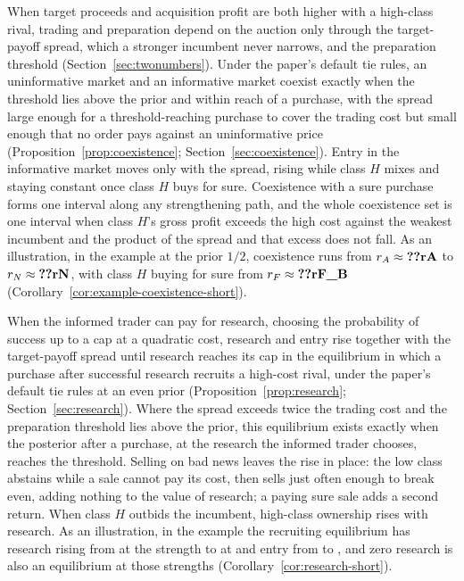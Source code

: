 When target proceeds and acquisition profit are both higher with a high-class rival, trading and preparation
depend on the auction only through the target-payoff spread, which a stronger incumbent never narrows, and the
preparation threshold (Section~\ref{sec:twonumbers}). Under the paper's default tie rules, an uninformative market and an
informative market coexist exactly when the threshold lies above the prior and within reach of a purchase, with the
spread large enough for a threshold-reaching purchase to cover the trading cost but small enough that no order pays
against an uninformative price (Proposition~\ref{prop:coexistence}; Section~\ref{sec:coexistence}). Entry in the
informative market moves only with the spread, rising while class \(H\) mixes and staying constant once class \(H\)
buys for sure. Coexistence with a sure purchase forms one interval along any strengthening path, and the whole
coexistence set is one interval when class \(H\)'s gross profit exceeds the high cost against the weakest incumbent
and the product of the spread and that excess does not fall. As an illustration, in the example at the prior
\(1/2\), coexistence runs from \(r_A\approx\reg{rA}\) to \(r_N\approx\reg{rN}\), with class \(H\) buying for sure
from \(r_F\approx\reg{rF_B}\) (Corollary~\ref{cor:example-coexistence-short}).

When the informed trader can pay for research, choosing the probability of success up to a cap at a quadratic cost,
research and entry rise together with the target-payoff spread until research reaches its cap in the equilibrium
in which a purchase after successful research recruits a high-cost rival, under the paper's default tie rules
at an even prior
(Proposition~\ref{prop:research}; Section~\ref{sec:research}). Where the spread exceeds twice the trading cost and
the preparation threshold lies above the prior, this equilibrium exists exactly when the posterior after a purchase,
at the research the informed trader chooses, reaches the threshold. Selling on bad news leaves the rise in place: the low
class abstains while a sale cannot pay its cost, then sells just often enough to break even, adding nothing to the
value of research; a paying sure sale adds a second return. When class \(H\) outbids the incumbent, high-class
ownership rises with research. As an illustration, in the example the recruiting equilibrium has research rising
from  at the strength  to  at  and entry from
 to , and zero research is also an equilibrium at those strengths
(Corollary~\ref{cor:research-short}).

